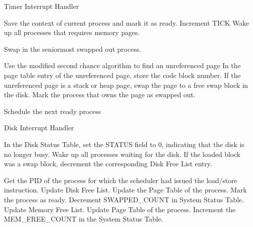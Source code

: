 \begin{algorithm}
\caption{Timer Interrupt Handler}
\begin{algorithmic}
\STATE Save the context of current process and mark it as ready.
\STATE Increment TICK   
        \STATE Wake up all processes that requires memory pages.
    \ELSE
        
           
            \STATE Swap in the seniormost swapped out process.
           
        \ENDIF
    \ENDIF
\ELSE
      
            \STATE Use the modified second chance algorithm to find an unreferenced page 
                \STATE In the page table entry of the unreferenced page, store the code block number.
            \ELSE
                \STATE If the unreferenced page is a stack or heap page, swap the page to a free swap block in the disk.
            \ENDIF
                \STATE Mark the process that owns the page as swapped out.
            \ENDIF
        
   \ENDIF
  
\ENDIF
\STATE Schedule the next ready process


\end{algorithmic}
\end{algorithm}


\begin{algorithm}
\caption{Disk Interrupt Handler}
\begin{algorithmic}
\STATE In the Disk Status Table, set the STATUS field to 0, indicating that the disk is no longer busy.
    \STATE Wake up all processes waiting for the disk.
    \STATE If the loaded block was a swap block, decrement the corresponding Disk Free List entry.
\ELSE
   
    \STATE Get the PID of the process for which the scheduler had issued the load/store instruction.
        \STATE Update Disk Free List.
        \STATE Update the Page Table of the process.
        \STATE Mark the process as ready. 
        \STATE Decrement SWAPPED\_COUNT in System Status Table.
    \ELSE 
        \STATE Update Memory Free List.
        \STATE Update Page Table of the process.
        \STATE Increment the MEM\_FREE\_COUNT in the System Status Table.
    \ENDIF
\ENDIF
\end{algorithmic}
\end{algorithm}

